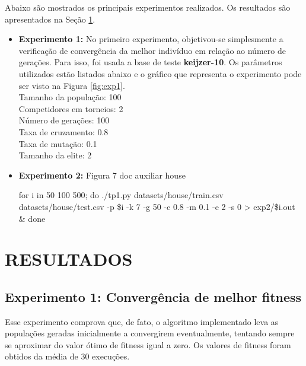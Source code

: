 \documentclass[12pt]{article}
\begin{document}
Abaixo são mostrados os principais experimentos realizados. Os resultados são apresentados
na Seção \ref{sec:result}.

\begin{itemize}
 \item \textbf{Experimento 1:} No primeiro experimento, objetivou-se simplesmente a verificação
 de convergência da melhor indivíduo em relação ao número de gerações. Para isso, foi usada
 a base de teste \textbf{keijzer-10}. Os parâmetros utilizados estão listados abaixo e o
 gráfico que representa o experimento pode ser visto na Figura \ref{fig:exp1}.\\
 
 Tamanho da população: 100\\
 Competidores em torneios: 2\\
 Número de gerações: 100\\
 Taxa de cruzamento: 0.8\\
 Taxa de mutação: 0.1\\
 Tamanho da elite: 2\\
 
 \item \textbf{Experimento 2:} Figura 7 doc auxiliar house
 
 for i in 50 100 500; do ./tp1.py datasets/house/train.csv datasets/house/test.csv -p \${i} -k 7 -g 50 -c 0.8 -m 0.1 -e 2 -s 0 > exp2/\${i}.out \& done
 
 

 
\end{itemize}


\section{RESULTADOS} \label{sec:result}

\subsection{Experimento 1: Convergência de melhor fitness}

Esse experimento comprova que, de fato, o algoritmo implementado leva as populações
geradas inicialmente a convergirem eventualmente, tentando sempre se aproximar do valor
ótimo de fitness igual a zero. Os valores de fitness foram obtidos da média de 30 execuções.
\end{document}
